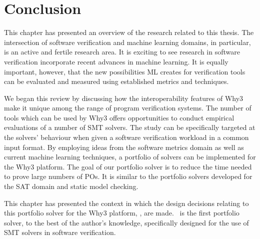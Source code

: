 \section{Conclusion}

This chapter has presented an overview of the research related to this thesis. 
The intersection of software verification and machine learning domains, in particular, is an active and fertile research area. 
It is exciting to see research in software verification incorporate recent advances in machine learning. 
It is equally important, however, that the new possibilities ML creates for verification tools can be evaluated and measured using established metrics and techniques. 

We began this review by discussing how the interoperability features of \textsf{Why3} make it unique among the range of program verification systems.
The number of tools which can be used by \textsf{Why3} offers opportunities to conduct empirical evaluations of a number of SMT solvers.
The study can be specifically targeted at the solvers' behaviour when given a software verification workload in a common input format.
By employing ideas from the software metrics domain as well as current machine learning techniques, a portfolio of solvers can be implemented for the \textsf{Why3} platform.
The goal of our portfolio solver is to reduce the time needed to prove large numbers of POs.
It is similar to the portfolio solvers developed for the SAT domain and static model checking.

This chapter has presented the context in which the design decisions relating to this portfolio solver for the \textsf{Why3} platform, \where, are made. 
\where~is the first portfolio solver, to the best of the author's knowledge, specifically designed for the use of SMT solvers in software verification.    



   
